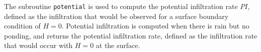 \documentclass{article}
\newcommand{\code}[1]{\texttt{#1}}
\begin{document}
The subroutine \code{potential} is used to compute the potential infiltration rate $PI$, defined as the infiltration that would be observed for a surface boundary condition of $H=0$. 
Potential infiltration is computed when there is rain but no ponding, and returns the potential infiltration rate, defined as the infiltration rate that would occur with $H=0$ at the surface.  


%
%
%
%
%		
%
\end{document}
